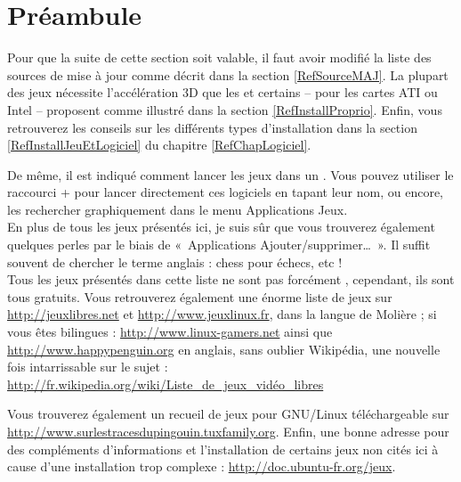 \section{Préambule}
Pour que la suite de cette section soit valable, il faut avoir modifié la liste des sources de mise à jour comme décrit dans la section \ref{RefSourceMAJ}. La plupart des jeux nécessite l'accélération 3D que les   et certains  -- pour les cartes ATI ou Intel -- proposent comme illustré dans la section \ref{RefInstallProprio}. Enfin, vous retrouverez les conseils sur les différents types d'installation dans la section \ref{RefInstallJeuEtLogiciel} du chapitre \ref{RefChapLogiciel}.\par
De même, il est indiqué comment lancer les jeux dans un . Vous pouvez utiliser le raccourci  +  pour lancer directement ces logiciels en tapant leur nom, ou encore, les rechercher graphiquement dans le menu Applications \FlecheDroite Jeux.\\
En plus de tous les jeux présentés ici, je suis sûr que vous trouverez également quelques perles par le biais de «~Applications \FlecheDroite Ajouter/supprimer\dots{}~». Il suffit souvent de chercher le terme anglais : chess pour échecs, etc !\\
Tous les jeux présentés dans cette liste ne sont pas forcément , cependant, ils sont tous gratuits. Vous retrouverez également une  énorme liste de jeux sur \url{http://jeuxlibres.net} et \url{http://www.jeuxlinux.fr}, dans la langue de Molière ; si vous êtes bilingues : \url{http://www.linux-gamers.net} ainsi que \url{http://www.happypenguin.org} en anglais, sans oublier Wikipédia, une nouvelle fois intarrissable sur le sujet : \url{http://fr.wikipedia.org/wiki/Liste_de_jeux_vidéo_libres}\par
Vous trouverez également un recueil de jeux pour GNU/Linux téléchargeable sur \url{http://www.surlestracesdupingouin.tuxfamily.org}. Enfin, une bonne adresse pour des compléments d'informations et l'installation de certains jeux non cités ici à cause d'une installation trop complexe : \url{http://doc.ubuntu-fr.org/jeux}.

